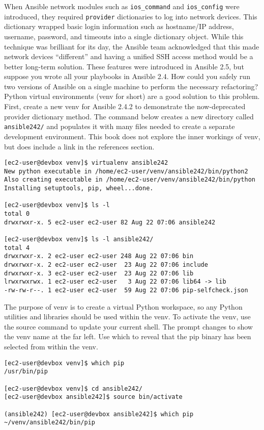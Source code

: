 When Ansible network modules such as \verb|ios_command| and \verb|ios_config| were
introduced, they required \verb|provider| dictionaries to log into network devices.
This dictionary wrapped basic login information such as hostname/IP address,
username, password, and timeouts into a single dictionary object. While this
technique was brilliant for its day, the Ansible team acknowledged that this
made network devices ``different'' and having a unified SSH access method would
be a better long-term solution. These features were introduced in Ansible 2.5,
but suppose you wrote all your playbooks in Ansible 2.4. How could you safely
run two versions of Ansible on a single machine to perform the necessary
refactoring? Python virtual environments (venv for short) are a good solution
to this problem. \\

First, create a new venv for Ansible 2.4.2 to demonstrate the now-deprecated
provider dictionary method. The command below creates a new directory called
\verb|ansible242/| and populates it with many files needed to create a separate
development environment. This book does not explore the inner workings of
venv, but does include a link in the references section.

\begin{verbatim}
[ec2-user@devbox venv]$ virtualenv ansible242
New python executable in /home/ec2-user/venv/ansible242/bin/python2
Also creating executable in /home/ec2-user/venv/ansible242/bin/python
Installing setuptools, pip, wheel...done.

[ec2-user@devbox venv]$ ls -l
total 0
drwxrwxr-x. 5 ec2-user ec2-user 82 Aug 22 07:06 ansible242

[ec2-user@devbox venv]$ ls -l ansible242/
total 4
drwxrwxr-x. 2 ec2-user ec2-user 248 Aug 22 07:06 bin
drwxrwxr-x. 2 ec2-user ec2-user  23 Aug 22 07:06 include
drwxrwxr-x. 3 ec2-user ec2-user  23 Aug 22 07:06 lib
lrwxrwxrwx. 1 ec2-user ec2-user   3 Aug 22 07:06 lib64 -> lib
-rw-rw-r--. 1 ec2-user ec2-user  59 Aug 22 07:06 pip-selfcheck.json
\end{verbatim}

The purpose of venv is to create a virtual Python workspace, so any Python
utilities and libraries should be used within the venv. To activate the venv,
use the source command to update your current shell. The prompt changes to
show the venv name at the far left. Use which to reveal that the pip binary
has been selected from within the venv.

\begin{verbatim}
[ec2-user@devbox venv]$ which pip
/usr/bin/pip

[ec2-user@devbox venv]$ cd ansible242/
[ec2-user@devbox ansible242]$ source bin/activate

(ansible242) [ec2-user@devbox ansible242]$ which pip
~/venv/ansible242/bin/pip
\end{verbatim}

